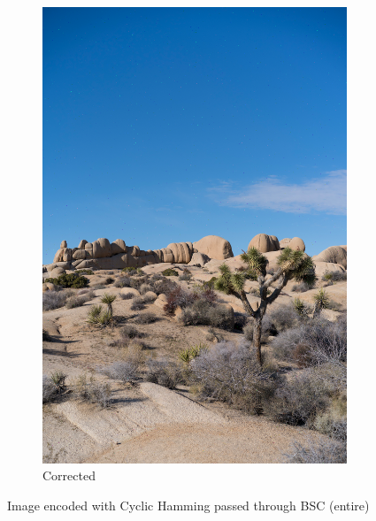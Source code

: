 \documentclass{article}
\begin{document}
\begin{figure}
\begin{subfigure}[b]{0.32\textwidth}
        \includegraphics[width=\textwidth]{../Result/cyclic-bsc-output-syndrome-corrected.png}
        \caption{Corrected}
        \label{fig:image-cyclic-bsc-syndrome-corrected}
    \end{subfigure}
       \caption{Image encoded with Cyclic Hamming passed through BSC (entire)}
       \label{fig:image-cyclic-bsc}
\end{figure}
\end{document}
